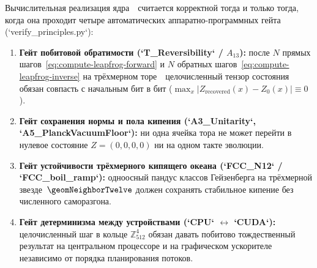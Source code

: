 Вычислительная реализация ядра~\latGCKshort\ считается корректной тогда и только тогда, когда она проходит четыре автоматических аппаратно-программных гейта (`verify\_principles.py`):
\begin{enumerate}[leftmargin=*]
\item \textbf{Гейт побитовой обратимости (`T\_Reversibility` / $A_{13}$):}
  после $N$ прямых шагов~\eqref{eq:compute-leapfrog-forward} и $N$ обратных шагов~\eqref{eq:compute-leapfrog-inverse} на трёхмерном торе~\latGCKshort\ целочисленный тензор состояния обязан совпасть с начальным бит в бит ($\max_x |Z_{\mathrm{recovered}}(x) - Z_0(x)| \equiv 0$).
\item \textbf{Гейт сохранения нормы и пола кипения (`A3\_Unitarity`, `A5\_PlanckVacuumFloor`):}
  ни одна ячейка тора не может перейти в нулевое состояние $Z = (0,0,0,0)$ ни на одном такте эволюции.
\item \textbf{Гейт устойчивости трёхмерного кипящего океана (`FCC\_N12` / `FCC\_boil\_ramp`):}
  одноосный пандус классов Гейзенберга на трёхмерной звезде~$\geomNeighborTwelve$ должен сохранять стабильное кипение без численного саморазгона.
\item \textbf{Гейт детерминизма между устройствами (`CPU` $\leftrightarrow$ `CUDA`):}
  целочисленный шаг в кольце $\mathbb{Z}_{512}^4$ обязан давать побитово тождественный результат на центральном процессоре и на графическом ускорителе независимо от порядка планирования потоков.
\end{enumerate}
